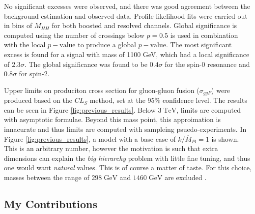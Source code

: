 \documentclass[12pt]{article}
\newcommand{\un}[1]{\;\text{#1}}
\begin{document}
No significant excesses were observed, and there was good agreement between the
background estimation and observed data. Profile likelihood fits were carried
out in bins of $M_{HH}$ for both boosted and resolved channels. Global
significance is computed using the number of crossings below $p=0.5$ is used in
combination with the local $p-\text{value}$ to produce a global
$p-\text{value}$. The most significant excess is found for a signal with mass of
1100 GeV, which had a local significance of $2.3\sigma$. The global significance
was found to be $0.4\sigma$ for the spin-0 resonance and $0.8\sigma$ for spin-2.

Upper limits on produciton cross section for gluon-gluon fusion ($\sigma_{ggF}$)
were produced based on the $CL_S$ method, set at the 95\% confidence level. The
results can be seen in Figure \ref{fig:previous_results}. Below $3\un{TeV}$,
limits are computed with asymptotic formulae. Beyond this mass point, this
approimation is innacurate and thus limits are computed with sampleing
psuedo-experiments. In Figure \ref{fig:previous_results}, a model with a base
case of $k/\overline{M}_{Pl}=1$ is shown. This is an arbitrary number, however
the motivation is such that extra dimensions can explain the \textit{big
hierarchy} problem with little fine tuning, and thus one would want
\textit{natural} values. This is of course a matter of taste. For this choice,
masses between the range of $298\;\text{GeV}$ and $1460\;\text{GeV}$ are
excluded \cite{atlas_resonant_2022}. 

\subsection{My Contributions}
\end{document}
